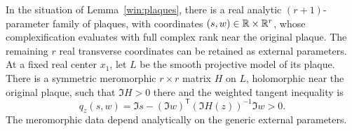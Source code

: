 \begin{lemma}\label{win:period}
In the situation of Lemma~\ref{win:plaques}, there is a real analytic
$(r+1)$-parameter family of plaques, with coordinates $(s,w)\in
\mathbb R\times\mathbb R^r$, whose complexification evaluates with full complex rank
near the original plaque.  The remaining $r$ real transverse coordinates
can be retained as external parameters.  At a fixed real center $x_1$,
let $L$ be the smooth projective model of its plaque.  There is a symmetric
meromorphic $r\times r$ matrix $H$ on $L$, holomorphic near the original
plaque, such that $\Im H>0$ there and the weighted tangent inequality is
\begin{equation}\label{win:quadratic-test}
       q_z(s,w)=\Im s-(\Im w)^{\mathsf T}
                          (\Im H(z))^{-1}\Im w>0.
\end{equation}
The meromorphic data depend analytically on the generic external
parameters.
\end{lemma}

